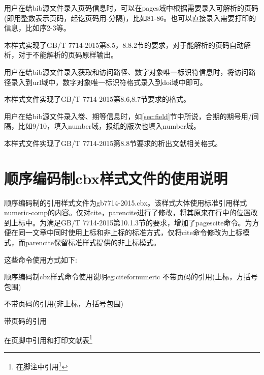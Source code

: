 \begin{property}{}{}
用户在给bib源文件录入页码信息时，可以在pages域中根据需要录入可解析的页码(即用整数表示页码，起讫页码用-分隔)，比如81-86。也可以直接录入需要打印的信息，比如序2-3等。

本样式实现了GB/T 7714-2015第8.5，8.8.2节的要求，对于能解析的页码自动解析，对于不能解析的页码原样输出。
\end{property}


\begin{property}{}{}
用户在给bib源文件录入获取和访问路径、数字对象唯一标识符信息时，将访问路径录入到url域中，数字对象唯一标识符格式录入到doi域中即可。

本样式文件实现了GB/T 7714-2015第8.6,8.7节要求的格式。
\end{property}

\begin{property}{}{}
用户在给bib源文件录入卷、期等信息时，如\ref{sec:field}节中所说，合期的期号用/间隔，比如9/10，填入number域，报纸的版次也填入number域。

本样式文件实现了GB/T 7714-2015第8.8节要求的析出文献相关格式。
\end{property}

\section{顺序编码制cbx样式文件的使用说明}\label{sec:cbx:usage}

顺序编码制的引用样式文件为gb7714-2015.cbx。该样式大体使用标准引用样式numeric-comp的内容。仅对cite，parencite进行了修改，将其原来在行中的位置改到上标中。为满足GB/T 7714-2015第10.1.3节的要求，增加了pagescite命令。为方便在同一文章中同时使用上标和非上标的标准方式，仅将cite命令修改为上标模式，而parencite保留标准样式提供的非上标模式。

这些命令使用方式如下:

\begin{codetex}{顺序编码制cbx样式命令使用说明}{eg:citefornumeric}
不带页码的引用(上标，方括号包围)\cite{Peebles2001-100-100}

不带页码的引用(非上标，方括号包围)\parencite{Miroslav2004--}

带页码的引用\cite[见][49页]{蔡敏2006--}\parencite[见][49页]{Miroslav2004--}


在页脚中引用和打印文献表\footnote{在脚注中引用\footcite{赵学功2001--}}
\end{codetex}

